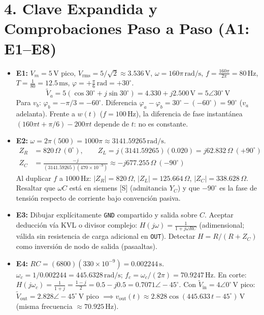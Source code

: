 \documentclass[11pt, a4paper]{article}
\newcommand{\phasor}[1]{\widetilde{#1}}
\begin{document}
\section*{4. Clave Expandida y Comprobaciones Paso a Paso (A1: E1--E8)}
\begin{itemize}\setlength\itemsep{0.2cm}
    \item \textbf{E1:} $V_m = 5\,\text{V}$ pico, $V_{\text{rms}} = 5/\sqrt{2} \approx 3.536\,\text{V}$, $\omega = 160\pi\,\text{rad/s}$, $f = \frac{160\pi}{2\pi} = 80\,\text{Hz}$, $T = \frac{1}{80} = 12.5\,\text{ms}$, $\varphi = +\frac{\pi}{6}\,\text{rad} = +30^\circ$.
    $$\phasor{V}_a = 5(\cos 30^\circ + j\sin 30^\circ) = 4.330 + j2.500\,\text{V} = 5\angle 30^\circ\,\text{V}$$
    Para $v_b$: $\varphi_b = -\pi/3 = -60^\circ$. Diferencia $\varphi_a - \varphi_b = 30^\circ - (-60^\circ) = 90^\circ$ ($v_a$ adelanta). Frente a $w(t)$ ($f = 100\,\text{Hz}$), la diferencia de fase instantánea $(160\pi t + \pi/6) - 200\pi t$ depende de $t$: no es constante.

    \item \textbf{E2:} $\omega = 2\pi(500) = 1000\pi \approx 3141.59265\,\text{rad/s}$.
    \begin{align*}
        Z_R &= 820\,\Omega\ (0^\circ), \qquad Z_L = j(3141.59265)(0.020) = j62.832\,\Omega\ (+90^\circ) \\
        Z_C &= \frac{-j}{(3141.59265)(470\times 10^{-9})} \approx -j677.255\,\Omega\ (-90^\circ)
    \end{align*}
    Al duplicar $f$ a $1000\,\text{Hz}$: $|Z_R| = 820\,\Omega$, $|Z_L| = 125.664\,\Omega$, $|Z_C| = 338.628\,\Omega$. Resaltar que $\omega C$ está en siemens [S] (admitancia $Y_C$) y que $-90^\circ$ es la fase de tensión respecto de corriente bajo convención pasiva.

    \item \textbf{E3:} Dibujar explícitamente \texttt{GND} compartido y salida sobre $C$. Aceptar deducción vía KVL o divisor complejo: $H(j\omega) = \frac{1}{1+j\omega RC}$ (adimensional; válida sin resistencia de carga adicional en \texttt{OUT}). Detectar $H = R/(R+Z_C)$ como inversión de nodo de salida (pasaaltas).

    \item \textbf{E4:} $RC = (6800)(330\times 10^{-9}) = 0.002244\,\text{s}$. $\omega_c = 1/0.002244 = 445.6328\,\text{rad/s}$; $f_c = \omega_c/(2\pi) = 70.9247\,\text{Hz}$. En corte: $H(j\omega_c) = \frac{1}{1+j} = \frac{1-j}{2} = 0.5 - j0.5 = 0.7071\angle -45^\circ$. Con $\phasor{V}_{\text{in}} = 4\angle 0^\circ\,\text{V}$ pico: $\phasor{V}_{\text{out}} = 2.828\angle -45^\circ\,\text{V}$ pico $\implies v_{\text{out}}(t) \approx 2.828\cos(445.633\,t - 45^\circ)\,\text{V}$ (misma frecuencia $\approx 70.925\,\text{Hz}$).


\end{itemize}
\end{document}

